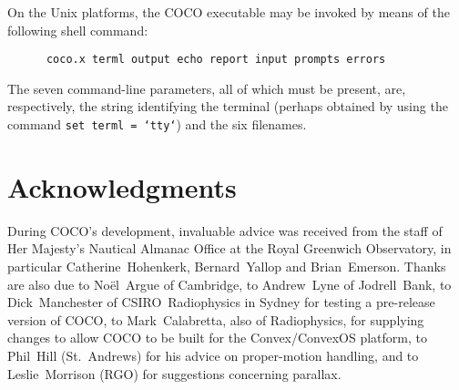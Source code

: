 On the Unix platforms, the COCO executable may be invoked by means of
the following shell command:

\begin{verbatim}
      coco.x terml output echo report input prompts errors
\end{verbatim}

The seven command-line parameters, all of which must be present,
are, respectively, the string identifying the terminal (perhaps
obtained by using the command {\tt set terml = `tty`}) and the
six filenames.

\section{Acknowledgments}

During COCO's development,
invaluable advice was received from the staff of Her Majesty's
Nautical Almanac Office at the Royal Greenwich
Observatory, in particular Catherine~Hohenkerk,
Bernard~Yallop and Brian~Emerson.
Thanks are also due to No\"{e}l~Argue of Cambridge,
to Andrew~Lyne of Jodrell~Bank,
to Dick~Manchester of CSIRO~Radiophysics in
Sydney for testing a pre-release version of COCO, to
Mark~Calabretta, also of Radiophysics, for supplying changes to
allow COCO to be built for the Convex/ConvexOS platform, to Phil~Hill
(St.~Andrews) for his advice on proper-motion handling, and to
Leslie~Morrison (RGO) for suggestions concerning parallax.


